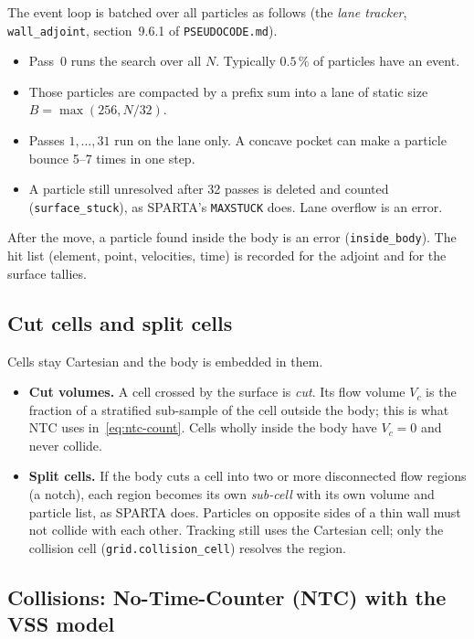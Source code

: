 \documentclass[11pt,a4paper]{article}
\numberwithin{equation}{section}
\newcommand{\code}[1]{\texttt{#1}}
\begin{document}
The event loop is batched over all particles as follows (the \emph{lane tracker},
\code{wall\_adjoint}, section~9.6.1 of \code{PSEUDOCODE.md}).
\begin{itemize}
\item Pass~0 runs the search over all $N$.  Typically $0.5\,\%$ of particles have an
  event.
\item Those particles are compacted by a prefix sum into a lane of static size
  $B = \max(256, N/32)$.
\item Passes $1,\dots,31$ run on the lane only.  A concave pocket can make a particle
  bounce 5--7 times in one step.
\item A particle still unresolved after 32 passes is deleted and counted
  (\code{surface\_stuck}), as SPARTA's \code{MAXSTUCK} does.  Lane overflow is an
  error.
\end{itemize}
After the move, a particle found inside the body is an error (\code{inside\_body}).
The hit list (element, point, velocities, time) is recorded for the adjoint and for
the surface tallies.

\subsection{Cut cells and split cells}
Cells stay Cartesian and the body is embedded in them.
\begin{itemize}
\item \textbf{Cut volumes.}  A cell crossed by the surface is \emph{cut}.  Its flow
  volume $V_c$ is the fraction of a stratified sub-sample of the cell outside the
  body; this is what NTC uses in~\eqref{eq:ntc-count}.  Cells wholly inside the body
  have $V_c = 0$ and never collide.
\item \textbf{Split cells.}  If the body cuts a cell into two or more disconnected
  flow regions (a notch), each region becomes its own \emph{sub-cell} with its own
  volume and particle list, as SPARTA does.  Particles on opposite sides of a thin
  wall must not collide with each other.  Tracking still uses the Cartesian cell; only
  the collision cell (\code{grid.collision\_cell}) resolves the region.
\end{itemize}

\subsection{Collisions: No-Time-Counter (NTC) with the VSS model}
\label{sec:primer-collide}
\end{document}
